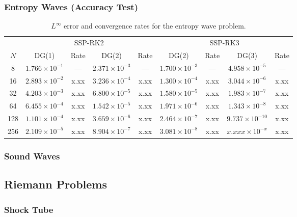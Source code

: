 \documentclass[10pt,preprint]{aastex}
\begin{document}
\subsubsection{Entropy Waves (Accuracy Test)}

\begin{table}
  \begin{center}
  \caption{$L^{\infty}$ error and convergence rates for the entropy wave problem.}
  \label{tab:streamingSineWave}
  \begin{tabular}{ccccccccc}
    & \multicolumn{4}{c}{SSP-RK2} & \multicolumn{4}{c}{SSP-RK3} \\
    \cmidrule(r){2-5} \cmidrule(r){6-9}
    $N$ & DG(1) & Rate & DG(2) & Rate & DG(2) & Rate & DG(3) & Rate \\
    \midrule \midrule
    8     & $1.766\times10^{-1}$ & ---  & $2.371\times10^{-3}$ & ---  & $1.700\times10^{-3}$ & ---  & $4.958\times10^{-5}$  & --- \\
    16   & $2.893\times10^{-2}$ &x.xx& $3.236\times10^{-4}$ &x.xx& $1.300\times10^{-4}$ &x.xx& $3.044\times10^{-6}$ &x.xx \\
    32   & $4.203\times10^{-3}$ &x.xx& $6.800\times10^{-5}$ &x.xx& $1.580\times10^{-5}$ &x.xx& $1.983\times10^{-7}$ &x.xx \\
    64   & $6.455\times10^{-4}$ &x.xx& $1.542\times10^{-5}$ &x.xx& $1.971\times10^{-6}$ &x.xx& $1.343\times10^{-8}$ &x.xx \\
    128 & $1.101\times10^{-4}$ &x.xx& $3.659\times10^{-6}$ &x.xx& $2.464\times10^{-7}$ &x.xx& $9.737\times10^{-10}$ &x.xx \\
    256 & $2.109\times10^{-5}$ &x.xx& $8.904\times10^{-7}$ &x.xx& $3.081\times10^{-8}$ &x.xx& $x.xxx\times10^{-x}$ &x.xx \\
    \midrule \midrule
  \end{tabular}
  \end{center}
\end{table}

\subsubsection{Sound Waves}

\subsection{Riemann Problems}

\subsubsection{Shock Tube}
\end{document}
